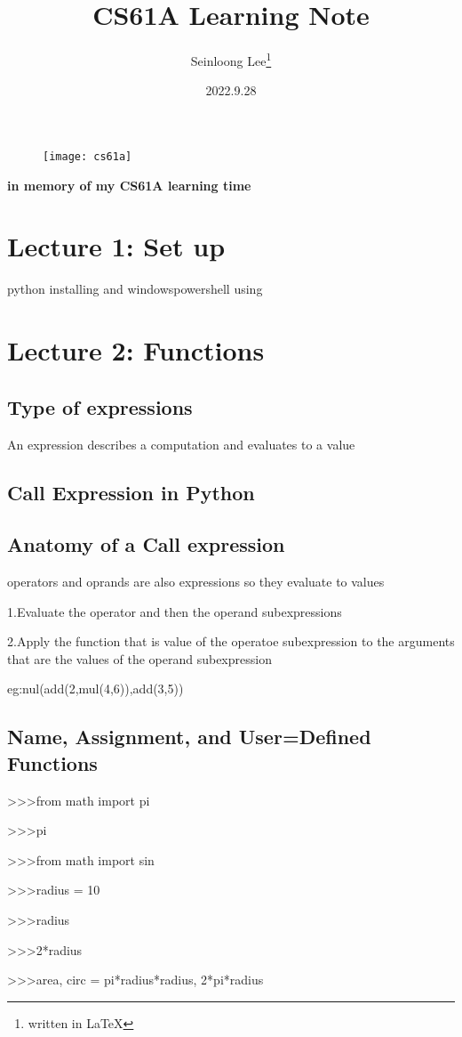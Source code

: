 \documentclass{article}
\title{CS61A Learning Note}
\author{Seinloong Lee\thanks{written in \LaTeX}}
\date{2022.9.28}
\begin{document}
\begin{figure}
\centering
\texttt{[image: cs61a]}
\end{figure}
\maketitle
\begin{center}
\textbf{in memory of my CS61A learning time}
\end{center}

\newpage
\section{Lecture 1: Set up}
python installing and  windowspowershell using
\par

\newpage
\section{Lecture 2: Functions}
\subsection{Type of expressions}
An expression describes a computation and evaluates to a value
\subsection{Call Expression in Python}
\subsection{Anatomy of a Call expression}
operators and oprands are also expressions
so they evaluate to values

1.Evaluate the operator and then the operand subexpressions
\par
2.Apply the function that is value of the operatoe subexpression to the arguments that are the values of the operand subexpression
\par
eg:nul(add(2,mul(4,6)),add(3,5))
\par
\subsection{Name, Assignment, and User=Defined Functions}
>>>from math import pi \par
>>>pi\par
>>>from math import sin\par
>>>radius = 10\par
>>>radius\par
>>>2*radius\par
>>>area, circ = pi*radius*radius, 2*pi*radius\par
\end{document}

